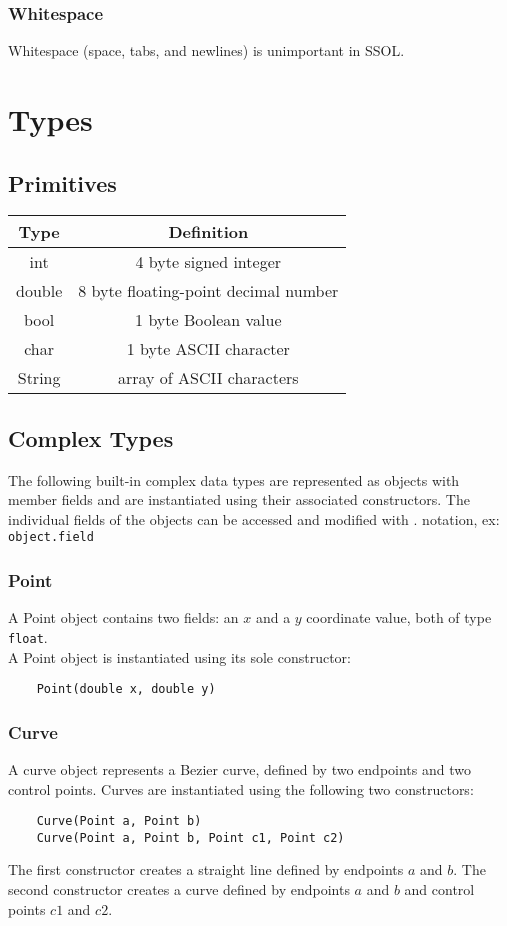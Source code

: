 \documentclass{article}
\begin{document}
\subsubsection{Whitespace}
Whitespace (space, tabs, and newlines) is unimportant in SSOL.

\section{Types}
\subsection{Primitives}
\begin{center}
\begin{tabular}{ |c c| }
    \hline 
    \bf Type & \bf Definition \\
    \hline
    int & 4 byte signed integer \\
    double & 8 byte floating-point decimal number \\
    bool & 1 byte Boolean value \\
    char & 1 byte ASCII character \\
    String & array of ASCII characters \\
    \hline
\end{tabular}
\end{center}

\subsection{Complex Types}
The following built-in complex data types are represented as objects with member fields and are instantiated using their associated constructors. The individual fields of the objects can be accessed and modified with $.$ notation, ex: \texttt{object.field}

\subsubsection{Point}
A Point object contains two fields: an $x$ and a $y$ coordinate value, both of type \texttt{float}. \\
A Point object is instantiated using its sole constructor: 
\begin{verbatim}
    Point(double x, double y)
\end{verbatim}

\subsubsection{Curve}
A curve object represents a Bezier curve, defined by two endpoints and two control points. Curves are instantiated using the following two constructors:
\begin{verbatim}
    Curve(Point a, Point b) 
    Curve(Point a, Point b, Point c1, Point c2) 
\end{verbatim}
The first constructor creates a straight line defined by endpoints $a$ and $b$.
The second constructor creates a curve defined by endpoints $a$ and $b$ and control points $c1$ and $c2$.
\end{document}
